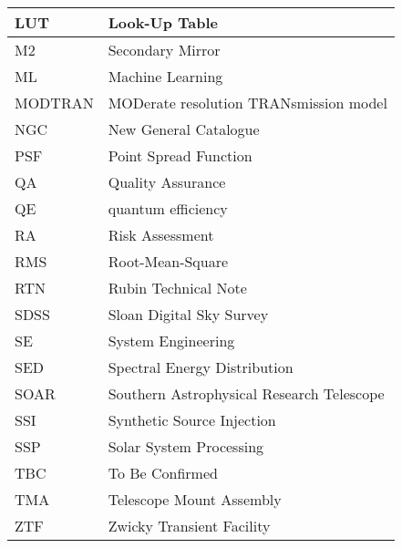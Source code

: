 \begin{longtable}{p{}p{}}
LUT & Look-Up Table \\\hline
M2 & Secondary Mirror \\\hline
ML & Machine Learning \\\hline
MODTRAN & MODerate resolution TRANsmission model \\\hline
NGC & New General Catalogue \\\hline
PSF & Point Spread Function \\\hline
QA & Quality Assurance \\\hline
QE & quantum efficiency \\\hline
RA & Risk Assessment \\\hline
RMS & Root-Mean-Square \\\hline
RTN & Rubin Technical Note \\\hline
SDSS & Sloan Digital Sky Survey \\\hline
SE & System Engineering \\\hline
SED & Spectral Energy Distribution \\\hline
SOAR & Southern Astrophysical Research Telescope \\\hline
SSI & Synthetic Source Injection \\\hline
SSP & Solar System Processing \\\hline
TBC & To Be Confirmed \\\hline
TMA & Telescope Mount Assembly \\\hline
ZTF & Zwicky Transient Facility \\\hline
\end{longtable}
